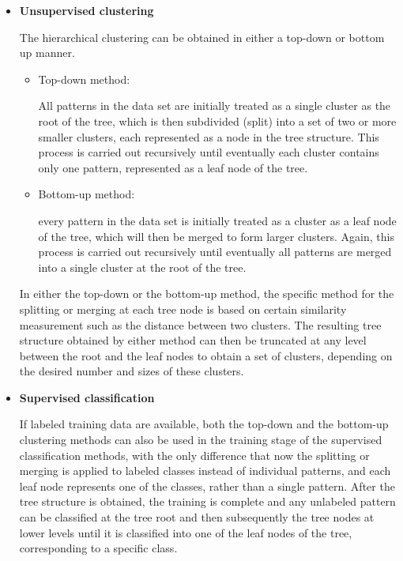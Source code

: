 \documentclass{article}
\begin{document}
\begin{itemize}
\item {\bf Unsupervised clustering}

  The hierarchical clustering can be obtained in either a top-down or bottom 
  up manner. 

  \begin{itemize}

  \item Top-down method:

    All patterns in the data set are initially 
    treated as a single cluster as the root of the tree, which is then 
    subdivided (split) into a set of two or more smaller clusters, each 
    represented as a node in the tree structure. This process is carried 
    out recursively until eventually each cluster contains only one pattern, 
    represented as a leaf node of the tree. 

  \item Bottom-up method:

    every pattern in the data set is initially 
    treated as a cluster as a leaf node of the tree, which will then be merged 
    to form larger clusters. Again, this process is carried out recursively 
    until eventually all patterns are merged into a single cluster at the root 
    of the tree. 

  \end{itemize}

  In either the top-down or the bottom-up method, the specific method for 
  the splitting or merging at each tree node is based on certain similarity
  measurement such as the distance between two clusters. The resulting tree
  structure obtained by either method can then be truncated at any level
  between the root and the leaf nodes to obtain a set of clusters, depending
  on the desired number and sizes of these clusters.  

\item {\bf Supervised classification}

  If labeled training data are available, both the top-down and the bottom-up 
  clustering methods can also be used in the training stage of the supervised 
  classification methods, with the only difference that now the splitting or
  merging is applied to labeled classes instead of individual patterns, and 
  each leaf node represents one of the classes, rather than a single pattern. 
  After the tree structure is obtained, the training is complete and any 
  unlabeled pattern can be classified at the tree root and then subsequently 
  the tree nodes at lower levels until it is classified into one of the leaf 
  nodes of the tree, corresponding to a specific class.


\end{itemize}
\end{document}
